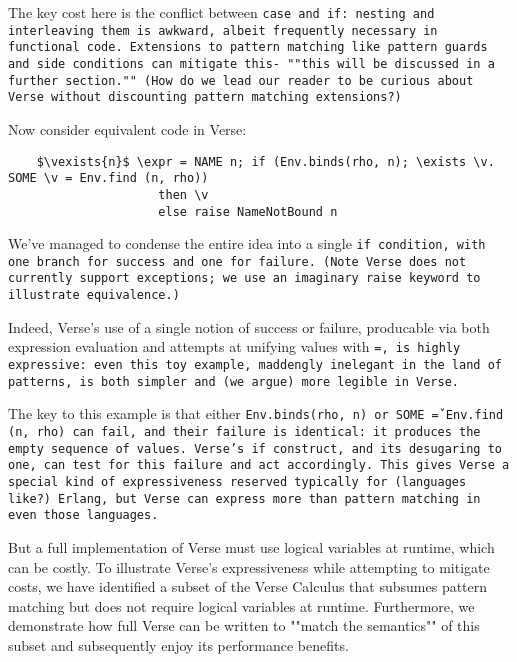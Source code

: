\documentclass[]{article}
\begin{document}
\bigskip 

The key cost here is the conflict between \tt{case} and \tt{if}: nesting and 
interleaving them is awkward, albeit frequently necessary in functional code. 
Extensions to pattern matching like pattern guards and side conditions can 
mitigate this- ""this will be discussed in a further section."" (How do we lead 
our reader to be curious about Verse without discounting pattern matching 
extensions?)

\bigskip

Now consider equivalent code in Verse: 
\verselst

\begin{lstlisting}
    $\vexists{n}$ \expr = NAME n; if (Env.binds(rho, n); \exists \v. SOME \v = Env.find (n, rho)) 
                     then \v
                     else raise NameNotBound n
\end{lstlisting}

\bigskip

We've managed to condense the entire idea into a single \tt{if} condition, 
with one branch for success and one for failure. (Note Verse does not currently
support exceptions; we use an imaginary \tt{raise} keyword to illustrate
equivalence.)

Indeed, Verse's use of a single notion of success or failure, producable via 
both expression evaluation and attempts at unifying values with \tt{=}, is 
highly expressive: even this toy example, maddengly inelegant in the land of 
patterns, is both simpler and (we argue) more legible in Verse. 

The key to this example is that either \tt{Env.binds(rho, n)}  or \tt{SOME \v =
Env.find (n, rho)} can fail, and their failure is identical: it produces the
empty sequence of values. Verse's \tt{if} construct, and its desugaring to
\tt{one}, can test for this failure and act accordingly. This gives Verse a 
special kind of expressiveness reserved typically for (languages like?) Erlang, 
but Verse can express more than pattern matching in even those languages. 




But a full implementation of Verse must use logical variables at runtime, which
can be costly. To illustrate Verse's expressiveness while attempting to mitigate
costs, we have identified a subset of the Verse Calculus that subsumes pattern
matching but does not require logical variables at runtime. Furthermore, we
demonstrate how full Verse can be written to ""match the semantics"" of this
subset and subsequently enjoy its performance benefits. 
\end{document}
